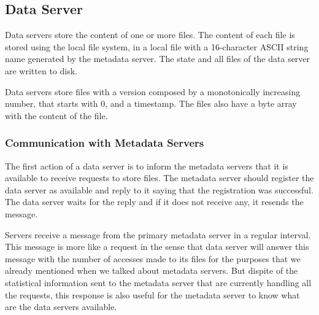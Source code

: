 \subsection{Data Server}

Data servers store the content of one or more files. The content of each
file is stored using the local file system, in a local file with a
16-character ASCII string name generated by the metadata server. The
state and all files of the data server are written to disk.

Data servers store files with a version composed by a
monotonically increasing number, that starts with 0, and a timestamp.
The files also have a byte array with the content of the file.

\subsubsection{Communication with Metadata Servers}

The first action of a data server is to inform the metadata servers that
it is available to receive requests to store files. The metadata
server should register the data server as available and reply to it saying 
that the registration was successful. The data server waits for the
reply and if it does not receive any, it resends the message.

Servers receive a message from the primary metadata server in a regular
interval. This message is more like a request in the sense that data server
will answer this message with the number of accesses made to its files
for the purposes that we already mentioned when we talked about metadata
servers. But dispite of the statistical information sent to the metadata server that are
currently handling all the requests, this response is also useful for the metadata
server to know what are the data servers available.



